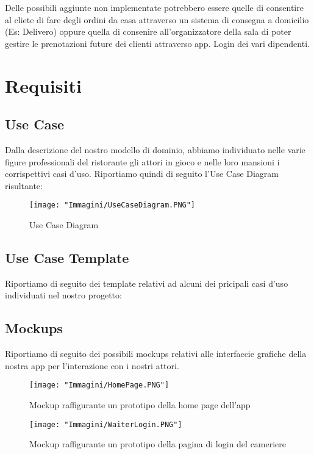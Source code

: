 \documentclass{article}
\begin{document}
Delle possibili aggiunte non implementate potrebbero essere quelle di consentire al cliete di fare degli ordini da casa attraverso un sistema di consegna a domicilio (Es: Delivero) oppure quella di consenire all'organizzatore della sala di poter gestire le prenotazioni future dei clienti attraverso app. Login dei vari dipendenti. 


\section{Requisiti}
\subsection{Use Case}
Dalla descrizione del nostro modello di dominio, abbiamo individuato nelle varie figure professionali del ristorante gli attori in gioco e nelle loro mansioni i corrispettivi casi d'uso. Riportiamo quindi di seguito l'Use Case Diagram risultante:

\begin{figure}[!h]
\centering
\texttt{[image: "Immagini/UseCaseDiagram.PNG"]}
\caption{Use Case Diagram}
\end{figure}

\newpage

\subsection{Use Case Template}
Riportiamo di seguito dei template relativi ad alcuni dei pricipali casi d'uso individuati nel nostro progetto:


\subsection{Mockups}
Riportiamo di seguito dei possibili mockups relativi alle interfaccie grafiche della nostra app per l'interazione con i nostri attori.

\begin{figure}[!h]
\centering
\texttt{[image: "Immagini/HomePage.PNG"]}
\caption{Mockup raffigurante un prototipo della home page dell'app}
\end{figure}

\begin{figure}[!h]
\centering
\texttt{[image: "Immagini/WaiterLogin.PNG"]}
\caption{Mockup raffigurante un prototipo della pagina di login del cameriere}
\end{figure}
\end{document}

